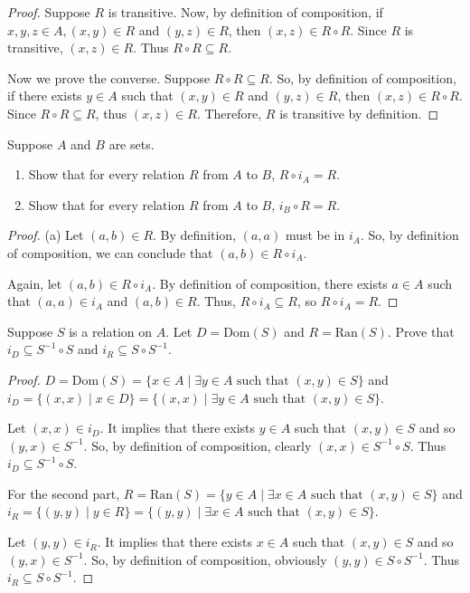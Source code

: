 \documentclass[12pt]{article}
\newenvironment{exercise}[2][Exercise]{\begin{trivlist}
\item[\hskip \labelsep {\bfseries #1}\hskip \labelsep {\bfseries #2.}]}{\end{trivlist}}
\begin{document}
\begin{proof}
	Suppose $R$ is transitive. Now, by definition of composition, if $x,y,z\in A, (x,y)\in R$ and $(y,z)\in R$, then $(x,z)\in R\circ R$. Since $R$ is transitive, $(x,z)\in R$. Thus $R\circ R\subseteq R$.

	Now we prove the converse. Suppose $R\circ R\subseteq R$. So, by definition of composition, if there exists $y\in A$ such that $(x,y)\in R$ and $(y,z)\in R$, then $(x,z)\in R\circ R$. Since $R\circ R\subseteq R$, thus $(x,z)\in R$. Therefore, $R$ is transitive by definition.        
\end{proof}

\begin{exercise}
	{9}
	Suppose \( A \) and \( B \) are sets.
	\begin{enumerate}
		\item[(a)] Show that for every relation \( R \) from \( A \) to \( B \), \( R \circ i_A = R \).
		\item[(b)] Show that for every relation \( R \) from \( A \) to \( B \), \( i_B \circ R = R \).
	\end{enumerate}
\end{exercise}

\begin{proof}
	(a) Let $(a,b)\in R$. By definition, $(a,a)$ must be in $i_A$. So, by definition of composition, we can conclude that $(a,b)\in R\circ i_A$.
	
	Again, let $(a,b)\in R\circ i_A$. By definition of composition, there exists $a\in A$ such that $(a,a)\in i_A$ and $(a,b)\in R$. Thus, $R\circ i_A\subseteq R$, so $R\circ i_A=R$.      
\end{proof}

\begin{exercise}
	{10}
	Suppose \( S \) is a relation on \( A \). Let \( D = \text{Dom}(S) \) and \( R = \text{Ran}(S) \). Prove that \( i_D \subseteq S^{-1} \circ S \) and \( i_R \subseteq S \circ S^{-1} \).
\end{exercise}

\begin{proof}
	$D=\text{Dom}(S)=\{x\in A\mid \exists y\in A \text{ such that } (x,y)\in S\}$ and $i_{D} =\{(x,x)\mid x\in D\}=\{(x,x)\mid \exists y\in A \text{ such that } (x,y)\in S\}$.
	
	Let $(x,x)\in i_{D}$. It implies that there exists $y\in A$ such that $(x,y)\in S$ and so $(y,x)\in S^{-1}$. So, by definition of composition, clearly $(x,x)\in S^{-1}\circ S$. Thus $i_{D} \subseteq S^{-1}\circ S$.
	
	For the second part, $R=\text{Ran}(S)=\{y\in A\mid \exists x\in A \text{ such that } (x,y)\in S\}$ and $i_{R} =\{(y,y)\mid y\in R\}=\{(y,y)\mid \exists x\in A \text{ such that } (x,y)\in S\}$.
	
	Let $(y,y)\in i_{R}$. It implies that there exists $x\in A$ such that $(x,y)\in S$ and so $(y,x)\in S^{-1}$. So, by definition of composition, obviously $(y,y)\in S\circ S^{-1}$. Thus $i_{R} \subseteq S\circ  S^{-1}$.      
\end{proof}
\end{document}
